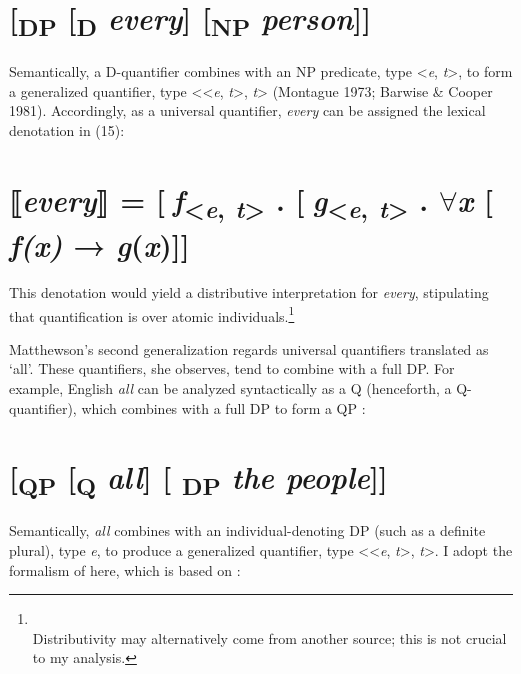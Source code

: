 \documentclass[output=paper]{langsci/langscibook}
\begin{document}
\chapter[      [DP [D every{]} [NP person{]}{]}]{      [\textsubscript{DP }[\textsubscript{D} \textit{every}] [\textsubscript{NP }\textit{person}]]}

Semantically, a D-quantifier combines with an NP predicate, type {\textless}\textit{e}, \textit{t}{\textgreater}, to form a generalized quantifier, type {\textless}{\textless}\textit{e}, \textit{t}{\textgreater}, \textit{t}{\textgreater} (Montague 1973; Barwise \& Cooper 1981). Accordingly, as a universal quantifier, \textit{every} can be assigned the lexical denotation in (15):

\chapter[      ⟦every⟧ = [f{\textless}e, t{\textgreater} . [g{\textless}e, t{\textgreater} . ${\forall}$x [ f(x) → g(x){]}{]}]{      ⟦\textit{every}⟧ = [\textit{f}\textsubscript{{\textless}}\textit{\textsubscript{e}}\textsubscript{,}\textit{\textsubscript{ t}}\textsubscript{{\textgreater}} . [\textit{g}\textsubscript{{\textless}}\textit{\textsubscript{e}}\textsubscript{,}\textit{\textsubscript{ t}}\textsubscript{{\textgreater}} . ${\forall}$\textit{x }[ \textit{f(x)} → \textit{g}(\textit{x})]]}

This denotation would yield a distributive interpretation for \textit{every}, stipulating that quantification is over atomic individuals.\footnote{\\
 Distributivity may alternatively come from another source; this is not crucial to my analysis.}

  Matthewson's second generalization regards universal quantifiers translated as ‘all’. These quantifiers, she observes, tend to combine with a full DP. For example, English \textit{all} can be analyzed syntactically as a Q (henceforth, a Q-quantifier), which combines with a full DP to form a QP \citep{Matthewson2001}:  

\chapter[      [QP [Q all{]} [ DP the people{]}{]}]{      [\textsubscript{QP} [\textsubscript{Q }\textit{all}] [\textsubscript{ DP} \textit{the people}]]}

Semantically, \textit{all} combines with an individual-denoting DP (such as a definite plural), type \textit{e}, to produce a generalized quantifier, type {\textless}{\textless}\textit{e},\textit{ t}{\textgreater}, \textit{t}{\textgreater}. I adopt the formalism of \citet{Zimmermann2014} here, which is based on \citet{Matthewson2001}:
\end{document}
